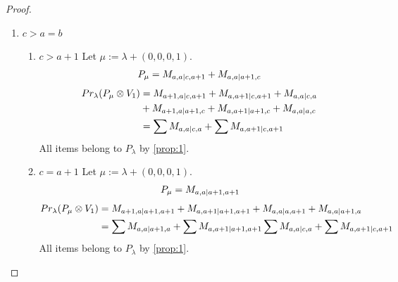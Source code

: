 \begin{proof}
\begin{enumerate}
\begin{enumerate}
    \item $a=b+1, c=a+1$
        Let $\mu:=\lambda + (0,0,0,2) $. 
\begin{equation}\notag
  \begin{aligned}
      P_{\mu} =
M_{b+1,b|b+2,b+2}
  \end{aligned}
\end{equation}
\begin{equation}\notag
  \begin{aligned}
    Pr_{\lambda}(P_\mu \otimes V_5) &=
M_{b+2,b+1|b+2,b+2}
+M_{b+1,b+1|b+1,b+2}
+M_{b+1,b+1|b+2,b+1}  \\
                                    &+
M_{b+1,b|b,b+2}
+M_{b+1,b|b+2,b} \\
                                    &=
\sum M_{b+1,b|b+2,b}
+\sum M_{b+1,b+1|b+2,b+1}
+ M_{b+2,b+1|b+2,b+2}
  \end{aligned}
\end{equation}
All items belong to $P_\lambda$ by \cref{prop:1}.
  \end{enumerate}

\item $c>a=b$ 
  \begin{enumerate}
    \item $c>a+1$
        Let $\mu:=\lambda + (0,0,0,1) $. 
\begin{equation}\notag
  \begin{aligned}
      P_{\mu} =
M_{a,a|c,a+1}
+M_{a,a|a+1,c}
  \end{aligned}
\end{equation}
\begin{equation}\notag
  \begin{aligned}
    Pr_{\lambda}(P_\mu \otimes V_1) &=
M_{a+1,a|c,a+1}
+M_{a,a+1|c,a+1}
+M_{a,a|c,a} \\
                                    &+
M_{a+1,a|a+1,c}
+M_{a,a+1|a+1,c}
+M_{a,a|a,c} \\
                                    &=
\sum M_{a,a|c,a}
+\sum M_{a,a+1|c,a+1}
  \end{aligned}
\end{equation}
All items belong to $P_\lambda$ by \cref{prop:1}.

    \item $c=a+1$
        Let $\mu:=\lambda + (0,0,0,1) $. 
\begin{equation}\notag
  \begin{aligned}
      P_{\mu} =
M_{a,a|a+1,a+1}
  \end{aligned}
\end{equation}
\begin{equation}\notag
  \begin{aligned}
    Pr_{\lambda}(P_\mu \otimes V_1) &=
M_{a+1,a|a+1,a+1}
+M_{a,a+1|a+1,a+1} 
+M_{a,a|a,a+1}
+M_{a,a|a+1,a} \\
                                    &=
\sum M_{a,a|a+1,a}
+\sum M_{a,a+1|a+1,a+1}
\sum M_{a,a|c,a}
+\sum M_{a,a+1|c,a+1}
  \end{aligned}
\end{equation}
All items belong to $P_\lambda$ by \cref{prop:1}.
  \end{enumerate}


\end{enumerate}
\end{proof}
